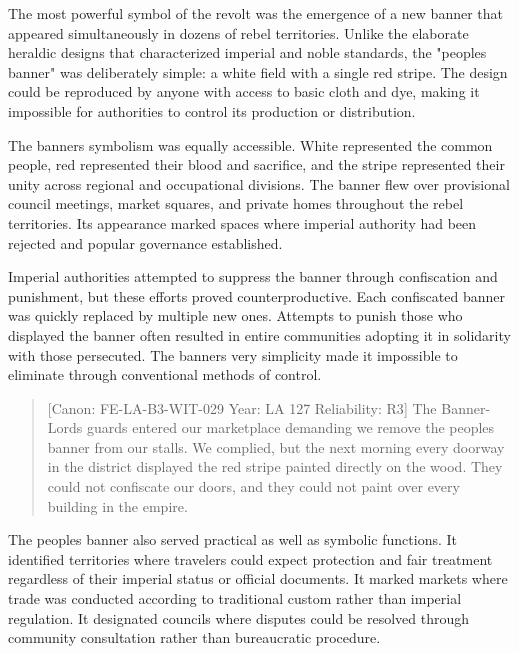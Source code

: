 The most powerful symbol of the revolt was the emergence of a new banner
that appeared simultaneously in dozens of rebel territories. Unlike the
elaborate heraldic designs that characterized imperial and noble
standards, the "people\textquotesingle s banner" was deliberately
simple: a white field with a single red stripe. The design could be
reproduced by anyone with access to basic cloth and dye, making it
impossible for authorities to control its production or distribution.

The banner\textquotesingle s symbolism was equally accessible. White
represented the common people, red represented their blood and
sacrifice, and the stripe represented their unity across regional and
occupational divisions. The banner flew over provisional council
meetings, market squares, and private homes throughout the rebel
territories. Its appearance marked spaces where imperial authority had
been rejected and popular governance established.

Imperial authorities attempted to suppress the banner through
confiscation and punishment, but these efforts proved counterproductive.
Each confiscated banner was quickly replaced by multiple new ones.
Attempts to punish those who displayed the banner often resulted in
entire communities adopting it in solidarity with those persecuted. The
banner\textquotesingle s very simplicity made it impossible to eliminate
through conventional methods of control.

\begin{quote}
{[}Canon: FE-LA-B3-WIT-029 \textbar{} Year: LA 127 \textbar{}
Reliability: R3{]} The Banner-Lord\textquotesingle s guards entered our
marketplace demanding we remove the people\textquotesingle s banner from
our stalls. We complied, but the next morning every doorway in the
district displayed the red stripe painted directly on the wood. They
could not confiscate our doors, and they could not paint over every
building in the empire.
\end{quote}

The people\textquotesingle s banner also served practical as well as
symbolic functions. It identified territories where travelers could
expect protection and fair treatment regardless of their imperial status
or official documents. It marked markets where trade was conducted
according to traditional custom rather than imperial regulation. It
designated councils where disputes could be resolved through community
consultation rather than bureaucratic procedure.

